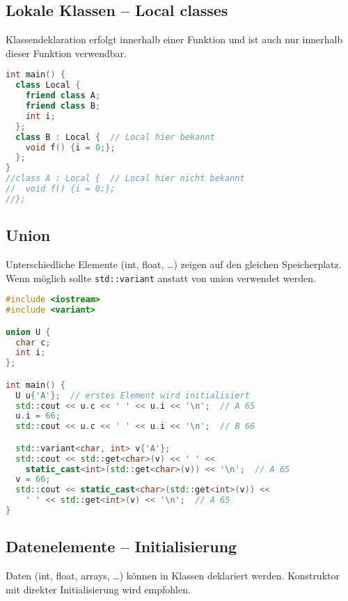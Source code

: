 \subsection{Lokale Klassen -- Local classes}

Klassendeklaration erfolgt innerhalb einer Funktion und ist auch nur innerhalb
dieser Funktion verwendbar.

\begin{lstlisting}[language=C++]
int main() {
  class Local {
    friend class A;
    friend class B;
    int i;
  };
  class B : Local {  // Local hier bekannt
    void f() {i = 0;};
  };
}
//class A : Local {  // Local hier nicht bekannt
//  void f() {i = 0;};
//};
\end{lstlisting}

\subsection{Union}

Unterschiedliche Elemente (int, float, \dots) zeigen auf den gleichen
Speicherplatz. Wenn möglich sollte \lstinline|std::variant| anstatt von union
verwendet werden.

\begin{lstlisting}[language=C++]
#include <iostream>
#include <variant>

union U {
  char c;
  int i;
};

int main() {
  U u{'A'};  // erstes Element wird initialisiert
  std::cout << u.c << ' ' << u.i << '\n';  // A 65
  u.i = 66;
  std::cout << u.c << ' ' << u.i << '\n';  // B 66

  std::variant<char, int> v{'A'};
  std::cout << std::get<char>(v) << ' ' <<
    static_cast<int>(std::get<char>(v)) << '\n';  // A 65
  v = 66;
  std::cout << static_cast<char>(std::get<int>(v)) <<
    ' ' << std::get<int>(v) << '\n';  // A 65
}
\end{lstlisting}

\subsection{Datenelemente -- Initialisierung}

Daten (int, float, arrays, \dots) können in Klassen deklariert werden.
Konstruktor mit direkter Initialisierung wird empfohlen.

